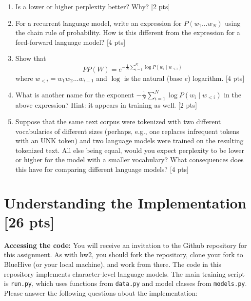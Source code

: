 \documentclass[11pt]{article}
\begin{document}
\begin{enumerate}[label=\alph*., itemsep=2em]
  \item Is a lower or higher perplexity better? Why? [2 pts]
  \item For a recurrent language model, write an expression for $P(w_1 \dots w_N)$ using the chain rule of probability.  How is this different from the expression for a feed-forward language model? [4 pts]
  \item Show that
  \[ PP(W) = e^{-\frac{1}{N} \sum_{i=1}^N \log P(w_i \mid w_{<i})} \]
  where $w_{<i} = w_1 w_2 \dots w_{i-1}$ and $\log$ is the natural (base $e$) logarithm. [4 pts]
  \item What is another name for the exponent $-\frac{1}{N} \sum_{i=1}^N \log P(w_i \mid w_{<i})$ in the above expression? Hint: it appears in training as well. [2 pts]
  \item Suppose that the same text corpus were tokenized with two different vocabularies of different sizes (perhaps, e.g., one replaces infrequent tokens with an UNK token) and two language models were trained on the resulting tokenized text.  All else being equal, would you expect perplexity to be lower or higher for the model with a smaller vocabulary?  What consequences does this have for comparing different language models? [4 pts]
\end{enumerate}

\vspace{2em}
\section{Understanding the Implementation [26 pts]}

\noindent \textbf{Accessing the code:} You will receive an invitation to the Github repository for this assignment. As with hw2, you should fork the repository, clone your fork to BlueHive (or your local machine), and work from there. The code in this repository implements character-level language models. The main training script is \texttt{run.py}, which uses functions from \texttt{data.py} and model classes from \texttt{models.py}. Please answer the following questions about the implementation:
\end{document}
